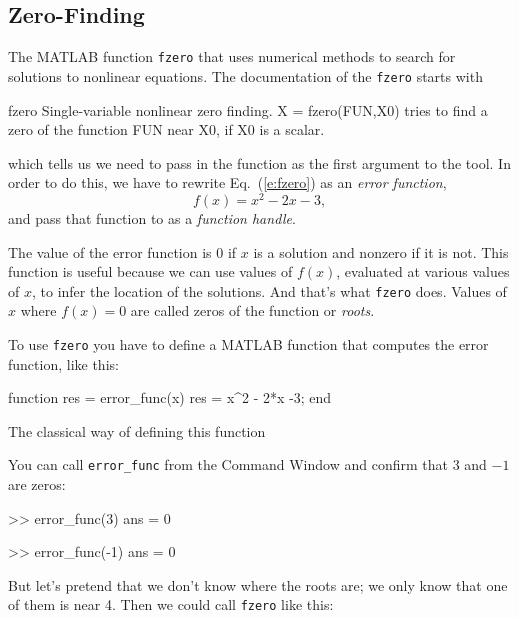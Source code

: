 \documentclass[../../book.tex]{subfiles}
\begin{document}
\subsection{Zero-Finding}
\label{zero}


The MATLAB function \lstinline{fzero} that uses numerical methods to search for solutions to nonlinear equations. The documentation of the \lstinline{fzero} starts with
\begin{stdout}
fzero  Single-variable nonlinear zero finding. 
    X = fzero(FUN,X0) tries to find a zero of the function FUN near X0, 
    if X0 is a scalar. 
\end{stdout}
which tells us we need to pass in the function  as the first argument to the  tool.
In order to do this, we have to rewrite Eq.~(\ref{e:fzero}) as an \emph{error function},
\begin{equation*}
f(x) = x^2 - 2x -3,
\end{equation*}
and pass that function to  as a \emph{function handle}.

The value of the error function is 0 if $x$ is a solution and nonzero if it is not.
This function is useful because we can use values of $f(x)$, evaluated at various values of $x$, to infer the location of the solutions.  And that's what \lstinline{fzero} does.
Values of $x$ where $f(x) = 0$ are called zeros of the function or \emph{roots}.


To use \lstinline{fzero} you have to define a MATLAB function that computes the error function, like this:
\begin{code}
function res = error_func(x)
    res = x^2 - 2*x -3;
end
\end{code}
The classical way of defining this function 

You can call \lstinline{error_func} from the Command Window and confirm that $3$ and $-1$ are zeros:

\begin{code}
>> error_func(3)
ans = 0

>> error_func(-1)
ans = 0
\end{code}

But let's pretend that we don't know where the roots are; we only know that one of them is near 4.  Then we could call \lstinline{fzero} like this:
\end{document}
